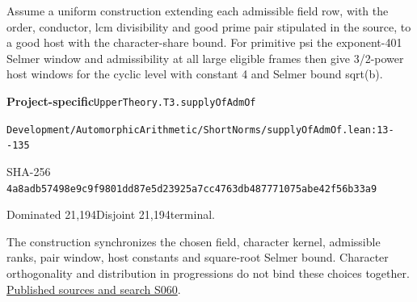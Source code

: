 
\begin{formalstatement}[D510]\label{decomp:D510}
Assume a uniform construction extending each admissible field row, with the order, conductor, lcm divisibility and good prime pair stipulated in the source, to a good host with the character-share bound. For primitive psi the exponent-401 Selmer window and admissibility at all large eligible frames then give 3/2-power host windows for the cyclic level with constant 4 and Selmer bound sqrt(b).
\end{formalstatement}
{\small\raggedright\noindent\textsf{\bfseries Project-specific}\quad \nolinkurl{UpperTheory.T3.supplyOfAdmOf}\par\noindent \nolinkurl{Development/AutomorphicArithmetic/ShortNorms/supplyOfAdmOf.lean:13--135}\par\noindent SHA-256 \nolinkurl{4a8adb57498e9c9f9801dd87e5d23925a7cc4763db487771075abe42f56b33a9}\par\noindent Dominated 21,194\quad Disjoint 21,194\quad terminal.\par}
The construction synchronizes the chosen field, character kernel, admissible ranks, pair window, host constants and square-root Selmer bound. Character orthogonality and distribution in progressions do not bind these choices together.
\hyperref[lit:S060]{Published sources and search S060}.

